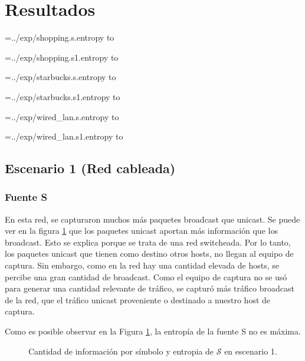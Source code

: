 \section{Resultados}

\newread\tmp

\openin\tmp=../exp/shopping.s.entropy
\read\tmp to \ShoppingSEntropy
\closein\tmp

\openin\tmp=../exp/shopping.s1.entropy
\read\tmp to \ShoppingSOneEntropy
\closein\tmp

\openin\tmp=../exp/starbucks.s.entropy
\read\tmp to \StarbucksSEntropy
\closein\tmp

\openin\tmp=../exp/starbucks.s1.entropy
\read\tmp to \StarbucksSOneEntropy
\closein\tmp

\openin\tmp=../exp/wired_lan.s.entropy
\read\tmp to \WiredLanSEntropy
\closein\tmp

\openin\tmp=../exp/wired_lan.s1.entropy
\read\tmp to \WiredLanSOneEntropy
\closein\tmp

\subsection{Escenario 1 (Red cableada)}

\subsubsection{Fuente S}

En esta red, se capturaron muchos más paquetes broadcast que unicast. Se puede ver en la figura \ref{res:esc1:fig1}
que los paquetes unicast aportan más información que los broadcast. Esto se explica porque se trata de una red switcheada. Por lo tanto, los paquetes unicast que tienen como destino otros hosts, no llegan al equipo de captura. Sin embargo, como en la red hay una cantidad elevada de hosts, se percibe una gran cantidad de broadcast. Como el equipo de captura no se usó para generar una cantidad relevante de tráfico, se capturó más tráfico broadcast de la red, que el tráfico unicast proveniente o destinado a nuestro host de captura.

Como es posible observar en la Figura \ref{res:esc1:fig1}, la entropía de la fuente S no es máxima.

\begin{figure}[h]
	\caption{Cantidad de información por símbolo y entropia de $\mathcal{S}$ en escenario 1.}
    \label{res:esc1:fig1}
\end{figure}
    
